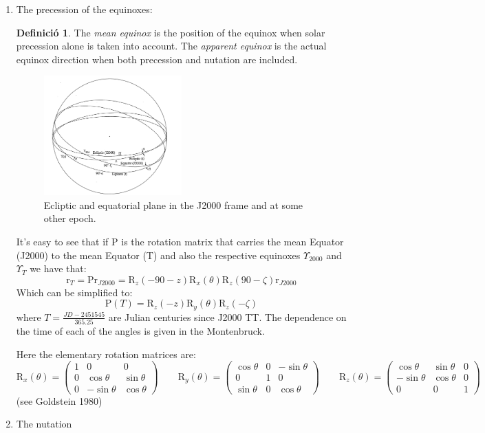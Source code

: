 \documentclass[10pt,a4paper]{article}
\newcommand{\vf}[1]{\boldsymbol{\mathrm{#1}}} %
\theoremstyle{definition}
\newtheorem{definition}{Definició}
\begin{document}
\begin{enumerate}
  \item The precession of the equinoxes:
        \begin{definition}
          The \emph{mean equinox} is the position of the equinox when solar precession alone is taken into account. The \emph{apparent equinox} is the actual equinox direction when both precession and nutation are included.
        \end{definition}
        \begin{figure}[ht]
          \centering
          \includegraphics[width=0.5\textwidth]{Images/celestialSphereMonte.png}
          \caption{Ecliptic and equatorial plane in the J2000 frame and at some other epoch.}
        \end{figure}
        It's easy to see that if $\vf{P}$ is the rotation matrix that carries the mean Equator (J2000) to the mean Equator (T) and also the respective equinoxes $\Upsilon_{2000}$ and $\Upsilon_T$ we have that:
        $$\vf{r}_T=\vf{P}\vf{r}_{J2000}=\vf{R}_z(-90-z)\vf{R}_x(\theta)\vf{R}_z(90-\zeta)\vf{r}_{J2000}$$
        Which can be simplified to:
        $$\boxed{\vf{P}(T)=\vf{R}_z(-z)\vf{R}_y(\theta)\vf{R}_z(-\zeta)}$$
        where $T=\frac{JD-2451545}{365.25}$ are Julian centuries since J2000 TT. The dependence on the time of each of the angles is given in the Montenbruck.

        Here the elementary rotation matrices are:
        $$\vf{R}_x(\theta)=\begin{pmatrix}
            1 & 0           & 0          \\
            0 & \cos\theta  & \sin\theta \\
            0 & -\sin\theta & \cos\theta
          \end{pmatrix}\qquad\vf{R}_y(\theta)=\begin{pmatrix}
            \cos\theta & 0 & -\sin\theta \\
            0          & 1 & 0           \\
            \sin\theta & 0 & \cos\theta
          \end{pmatrix}\qquad\vf{R}_z(\theta)=\begin{pmatrix}
            \cos\theta  & \sin\theta & 0 \\
            -\sin\theta & \cos\theta & 0 \\
            0           & 0          & 1
          \end{pmatrix}$$
        (see Goldstein 1980)
  \item The nutation


\end{enumerate}
\end{document}
